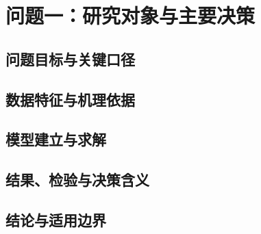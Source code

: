\SectionStart
\section{问题一：研究对象与主要决策}
\subsection{问题目标与关键口径}
\subsection{数据特征与机理依据}
\subsection{模型建立与求解}
\subsection{结果、检验与决策含义}
\subsection{结论与适用边界}
